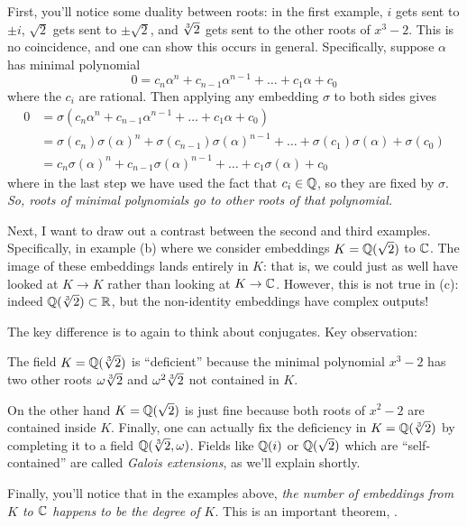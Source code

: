 \begin{itemize}
\ii
First, you'll notice some duality between roots: in the first example, $i$ gets sent to $\pm i$,
$\sqrt 2$ gets sent to $\pm \sqrt 2$, and $\sqrt[3]{2}$ gets sent to the other roots of $x^3-2$.
This is no coincidence, and one can show this occurs in general.
Specifically, suppose $\alpha$ has minimal polynomial
\[ 0 = c_n \alpha^n + c_{n-1} \alpha^{n-1} + \dots + c_1\alpha + c_0 \]
where the $c_i$ are rational.
Then applying any embedding $\sigma$ to both sides gives
\begin{align*}
	0 &= \sigma(c_n \alpha^n + c_{n-1} \alpha^{n-1} + \dots + c_1\alpha + c_0) \\
	&= \sigma(c_n) \sigma(\alpha)^n + \sigma(c_{n-1}) \sigma(\alpha)^{n-1}
	+ \dots + \sigma(c_1)\sigma(\alpha) + \sigma(c_0) \\
	&= c_n \sigma(\alpha)^n + c_{n-1} \sigma(\alpha)^{n-1} + \dots + c_1\sigma(\alpha) + c_0
\end{align*}
where in the last step we have used the fact that $c_i \in \mathbb Q$, so they are fixed by $\sigma$.
\emph{So, roots of minimal polynomials go to other roots of that polynomial.}

\ii
Next, I want to draw out a contrast between the second and third examples.
Specifically, in example (b) where we consider embeddings $K = \mathbb Q(\sqrt 2)$
to $\mathbb C$.  The image of these embeddings lands entirely in $K$: that is, we
could just as well have looked at $K \to K$ rather than looking at $K \to \mathbb C$.
However, this is not true in (c): indeed $\mathbb Q(\sqrt[3]{2}) \subset \mathbb R$,
but the non-identity embeddings have complex outputs!

The key difference is to again to think about conjugates.
Key observation:
\begin{moral}
	The field $K = \mathbb Q(\sqrt[3]{2})$ is ``deficient'' because the minimal polynomial $x^3-2$
	has two other roots $\omega \sqrt[3]{2}$ and $\omega^2 \sqrt[3]{2}$ not contained in $K$.
\end{moral}
On the other hand $K = \mathbb Q(\sqrt 2)$ is just fine because both roots of $x^2-2$ are contained inside $K$.
Finally, one can actually fix the deficiency in $K = \mathbb Q(\sqrt[3]{2})$ by completing it to a field $\mathbb Q(\sqrt[3]{2}, \omega)$.
Fields like $\mathbb Q(i)$ or $\mathbb Q(\sqrt 2)$ which are ``self-contained'' are called
\emph{Galois extensions}, as we'll explain shortly.

\ii
Finally, you'll notice that in the examples above, \emph{the number of embeddings from $K$ to $\mathbb C$
happens to be the degree of $K$}.
This is an important theorem, .
\end{itemize}


